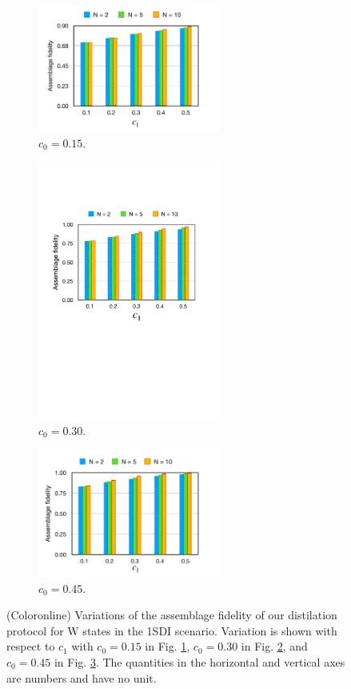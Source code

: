\documentclass[reprint,superscriptaddress,nofootinbib,amsmath,amssymb,aps,pra,longbibliography]{revtex4-1}
\begin{document}
\begin{figure}
   \begin{subfigure}{6cm}
   \centering\includegraphics[width=6cm]{AF_w_c015.pdf}
    \caption{\footnotesize $c_0=0.15$.}
    \label{AFc015}
  \end{subfigure}%
  \begin{subfigure}{6cm}
    \centering\includegraphics[width=6cm]{AF_w_c030.pdf}
    \caption{\footnotesize $c_0=0.30$.}
    \label{AFc30}
  \end{subfigure}%
   \begin{subfigure}{6cm}
    \centering\includegraphics[width=6cm]{AF_w_c045.pdf}
    \caption{\footnotesize $c_0=0.45$.}
    \label{AFc45}
  \end{subfigure}%
\caption{\footnotesize (Coloronline) Variations of the assemblage fidelity of our distilation protocol for W states in the 1SDI scenario.  Variation is shown with respect
to $c_1$ with $c_0 = 0.15$ in Fig. \ref{AFc015}, $c_0 = 0.30$ in Fig. \ref{AFc30},
and $c_0 = 0.45$ in Fig. \ref{AFc45}. The quantities in the horizontal and vertical axes are numbers and have no unit.}
\label{AF_w}
\end{figure}
\end{document}
